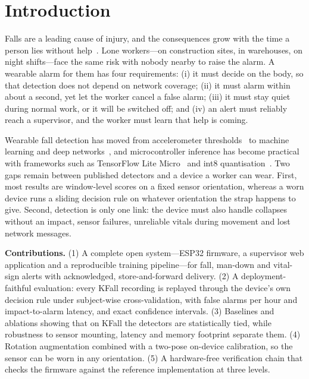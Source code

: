 \documentclass[conference]{IEEEtran}
\begin{document}
\section{Introduction}
Falls are a leading cause of injury, and the consequences grow with the time a person lies
without help~\cite{igual2013challenges,mubashir2013survey}. Lone workers---on construction
sites, in warehouses, on night shifts---face the same risk with nobody nearby to raise the
alarm. A wearable alarm for them has four requirements: (i) it must decide on the body, so
that detection does not depend on network coverage; (ii) it must alarm within about a
second, yet let the worker cancel a false alarm; (iii) it must stay quiet during normal
work, or it will be switched off; and (iv) an alert must reliably reach a supervisor, and
the worker must learn that help is coming.

Wearable fall detection has moved from accelerometer thresholds~\cite{bourke2007threshold,kangas2008comparison}
to machine learning and deep networks~\cite{santos2019cnn,musci2021rnn,ramachandran2020survey},
and microcontroller inference has become practical with frameworks such as TensorFlow Lite
Micro~\cite{david2021tflm} and int8 quantisation~\cite{jacob2018quantization}. Two gaps
remain between published detectors and a device a worker can wear. First, most results are
window-level scores on a fixed sensor orientation, whereas a worn device runs a sliding
decision rule on whatever orientation the strap happens to give. Second, detection is only
one link: the device must also handle collapses without an impact, sensor failures,
unreliable vitals during movement and lost network messages.

\textbf{Contributions.} (1) A complete open system---ESP32 firmware, a supervisor web
application and a reproducible training pipeline---for fall, man-down and vital-sign
alerts with acknowledged, store-and-forward delivery. (2) A deployment-faithful evaluation:
every KFall recording is replayed through the device's own decision rule under
subject-wise cross-validation, with false alarms per hour and impact-to-alarm latency, and
exact confidence intervals. (3) Baselines and ablations showing that on KFall the
detectors are statistically tied, while robustness to sensor mounting, latency and memory
footprint separate them. (4) Rotation augmentation combined with a two-pose on-device
calibration, so the sensor can be worn in any orientation. (5) A hardware-free
verification chain that checks the firmware against the reference implementation at
three levels.
\end{document}
